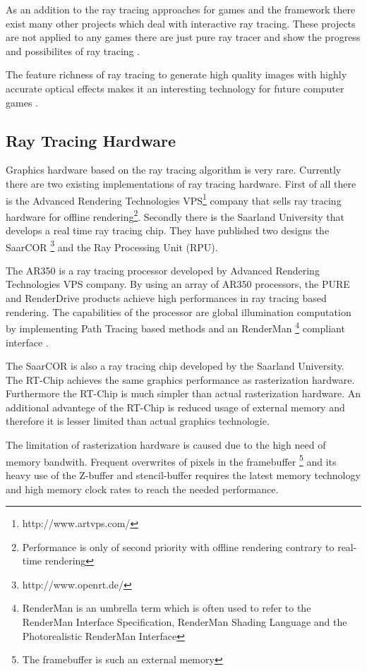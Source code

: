 \documentclass[DIV10, abstracton, openright, footsepline, headsepline, twoside, 9pt,
bigheadings]{scrreprt}
\begin{document}
As an addition to the ray tracing approaches for games and the framework there
exist many other projects which deal with interactive ray tracing. These
projects are not applied to any games there are just pure ray tracer and show
the progress and possibilites of ray tracing \cite{Wald04} \cite{Wds04}
\cite{Wbs03} \cite{Bws03} \cite{Gws04}.

The feature richness of ray tracing to generate high quality images with highly
accurate optical effects makes it an interesting technology for future computer
games \cite{Schmittler04}.


\subsection{Ray Tracing Hardware}
Graphics hardware based on the ray tracing algorithm is very rare. Currently
there are two existing implementations of ray tracing hardware. First of all
there is the Advanced Rendering Technologies VPS\footnote{http://www.artvps.com/}
company that sells ray tracing hardware for offline rendering\footnote{Performance
is only of second priority with offline rendering contrary to real-time rendering}.
Secondly there is the Saarland University that develops a real time
ray tracing chip. They have published two designs the SaarCOR
\footnote{http://www.openrt.de/} and the Ray Processing Unit (RPU).

The AR350 is a ray tracing processor developed by Advanced Rendering
Technologies VPS company. By using an array of AR350 processors, the PURE and
RenderDrive products achieve high performances in ray tracing based rendering.
The capabilities of the processor are global illumination computation by
implementing Path Tracing based methods and an RenderMan \footnote{RenderMan is
an umbrella term which is often used to refer to the RenderMan Interface
Specification, RenderMan Shading Language and the Photorealistic RenderMan
Interface} compliant interface \cite{Cassagnabere05}.

The SaarCOR is also a ray tracing chip developed by the Saarland University.
The RT-Chip achieves the same graphics performance as rasterization hardware.
Furthermore the RT-Chip is much simpler than actual rasterization hardware.
An additional advantege of the RT-Chip is reduced usage of external memory
and therefore it is lesser limited than actual graphics technologie.

The limitation of rasterization hardware is caused due to the high need of
memory bandwith. Frequent overwrites of pixels in the framebuffer \footnote{The
framebuffer is such an external memory} and its heavy use of the Z-buffer
and stencil-buffer requires the latest memory technology and high memory
clock rates to reach the needed performance.
\end{document}
